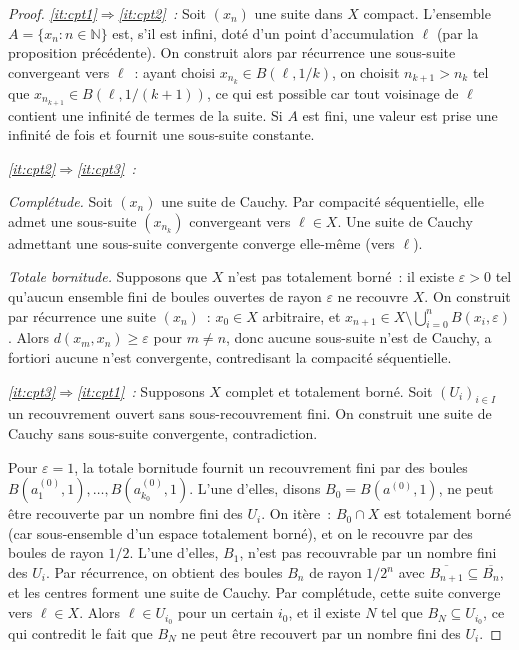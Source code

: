 \documentclass[12pt,a4paper,openany]{book}
\theoremstyle{definition}
\theoremstyle{cours}
\theoremstyle{coursnormal}
\newcommand{\N}{\mathbb{N}}
\begin{document}
\begin{proof}
  \emph{\ref{it:cpt1}$\Rightarrow$\ref{it:cpt2}~:} Soit $(x_n)$ une suite
  dans $X$ compact. L'ensemble $A=\{x_n:n\in\N\}$ est, s'il est infini,
  doté d'un point d'accumulation $\ell$ (par la proposition précédente). On
  construit alors par récurrence une sous-suite convergeant vers $\ell$~: ayant
  choisi $x_{n_k}\in B(\ell,1/k)$, on choisit $n_{k+1}>n_k$ tel que
  $x_{n_{k+1}}\in B(\ell,1/(k+1))$, ce qui est possible car tout voisinage de
  $\ell$ contient une infinité de termes de la suite. Si $A$ est fini, une
  valeur est prise une infinité de fois et fournit une sous-suite constante.

  \medskip
  \emph{\ref{it:cpt2}$\Rightarrow$\ref{it:cpt3}~:}

  \emph{Complétude.} Soit $(x_n)$ une suite de Cauchy. Par compacité
  séquentielle, elle admet une sous-suite $(x_{n_k})$ convergeant vers
  $\ell\in X$. Une suite de Cauchy admettant une sous-suite convergente
  converge elle-même (vers $\ell$).

  \emph{Totale bornitude.} Supposons que $X$ n'est pas totalement borné~: il
  existe $\varepsilon>0$ tel qu'aucun ensemble fini de boules ouvertes de rayon
  $\varepsilon$ ne recouvre $X$. On construit par récurrence une suite
  $(x_n)$~: $x_0\in X$ arbitraire, et $x_{n+1}\in X\setminus\bigcup_{i=0}^n
  B(x_i,\varepsilon)$. Alors $d(x_m,x_n)\geq\varepsilon$ pour $m\neq n$,
  donc aucune sous-suite n'est de Cauchy, a fortiori aucune n'est convergente,
  contredisant la compacité séquentielle.

  \medskip
  \emph{\ref{it:cpt3}$\Rightarrow$\ref{it:cpt1}~:} Supposons $X$ complet et
  totalement borné. Soit $(U_i)_{i\in I}$ un recouvrement ouvert sans
  sous-recouvrement fini. On construit une suite de Cauchy sans sous-suite
  convergente, contradiction.

  Pour $\varepsilon=1$, la totale bornitude fournit un recouvrement fini par
  des boules $B(a_1^{(0)},1),\ldots,B(a_{k_0}^{(0)},1)$. L'une d'elles,
  disons $B_0=B(a^{(0)},1)$, ne peut être recouverte par un nombre fini des
  $U_i$. On itère~: $B_0\cap X$ est totalement borné (car sous-ensemble d'un
  espace totalement borné), et on le recouvre par des boules de rayon $1/2$.
  L'une d'elles, $B_1$, n'est pas recouvrable par un nombre fini des $U_i$.
  Par récurrence, on obtient des boules $B_n$ de rayon $1/2^n$ avec
  $\overline{B_{n+1}}\subseteq \overline{B_n}$, et les centres forment une
  suite de Cauchy. Par complétude, cette suite converge vers $\ell\in X$. Alors
  $\ell\in U_{i_0}$ pour un certain $i_0$, et il existe $N$ tel que
  $B_N\subseteq U_{i_0}$, ce qui contredit le fait que $B_N$ ne peut être
  recouvert par un nombre fini des $U_i$.
\end{proof}
\end{document}
